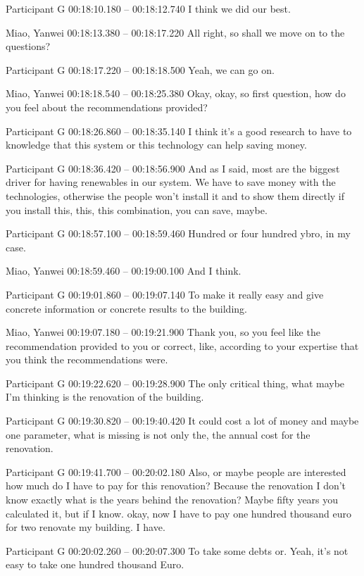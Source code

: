 {Participant G 00:18:10.180 -- 00:18:12.740
I think we did our best.

Miao, Yanwei 00:18:13.380 -- 00:18:17.220
All right, so shall we move on to the questions?

Participant G 00:18:17.220 -- 00:18:18.500
Yeah, we can go on.

Miao, Yanwei 00:18:18.540 -- 00:18:25.380
Okay, okay, so first question, how do you feel about the recommendations provided?

Participant G 00:18:26.860 -- 00:18:35.140
I think it's a good research to have to knowledge that this system or this technology can help saving money.

Participant G 00:18:36.420 -- 00:18:56.900
And as I said, most are the biggest driver for having renewables in our system. We have to save money with the technologies, otherwise the people won't install it and to show them directly if you install this, this, this combination, you can save, maybe.

Participant G 00:18:57.100 -- 00:18:59.460
Hundred or four hundred ybro, in my case.

Miao, Yanwei 00:18:59.460 -- 00:19:00.100
And I think.

Participant G 00:19:01.860 -- 00:19:07.140
To make it really easy and give concrete information or concrete results to the building.

Miao, Yanwei 00:19:07.180 -- 00:19:21.900
Thank you, so you feel like the recommendation provided to you or correct, like, according to your expertise that you think the recommendations were.

Participant G 00:19:22.620 -- 00:19:28.900
The only critical thing, what maybe I'm thinking is the renovation of the building.

Participant G 00:19:30.820 -- 00:19:40.420
It could cost a lot of money and maybe one parameter, what is missing is not only the, the annual cost for the renovation.

Participant G 00:19:41.700 -- 00:20:02.180
Also, or maybe people are interested how much do I have to pay for this renovation? Because the renovation I don't know exactly what is the years behind the renovation? Maybe fifty years you calculated it, but if I know. okay, now I have to pay one hundred thousand euro for two renovate my building. I have.

Participant G 00:20:02.260 -- 00:20:07.300
To take some debts or. Yeah, it's not easy to take one hundred thousand Euro.

}
